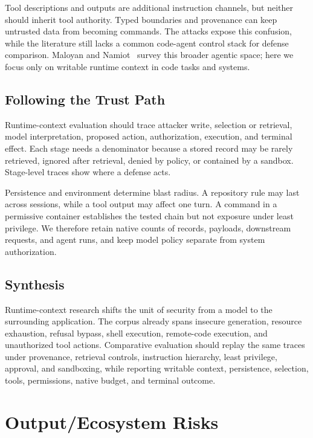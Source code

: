\documentclass[acmsmall,screen,review]{acmart}
\begin{document}
Tool descriptions and outputs are additional instruction channels, but neither should inherit tool authority. Typed boundaries and provenance can keep untrusted data from becoming commands. The attacks expose this confusion, while the literature still lacks a common code-agent control stack for defense comparison. Maloyan and Namiot~\cite{maloyan2026promptinjection} survey this broader agentic space; here we focus only on writable runtime context in code tasks and systems.

\subsection{Following the Trust Path}
Runtime-context evaluation should trace attacker write, selection or retrieval, model interpretation, proposed action, authorization, execution, and terminal effect. Each stage needs a denominator because a stored record may be rarely retrieved, ignored after retrieval, denied by policy, or contained by a sandbox. Stage-level traces show where a defense acts.

Persistence and environment determine blast radius. A repository rule may last across sessions, while a tool output may affect one turn. A command in a permissive container establishes the tested chain but not exposure under least privilege. We therefore retain native counts of records, payloads, downstream requests, and agent runs, and keep model policy separate from system authorization.

\subsection{Synthesis}
Runtime-context research shifts the unit of security from a model to the surrounding application. The corpus already spans insecure generation, resource exhaustion, refusal bypass, shell execution, remote-code execution, and unauthorized tool actions. Comparative evaluation should replay the same traces under provenance, retrieval controls, instruction hierarchy, least privilege, approval, and sandboxing, while reporting writable context, persistence, selection, tools, permissions, native budget, and terminal outcome.

\section{Output/Ecosystem Risks} \label{sec:gensec}
\end{document}

